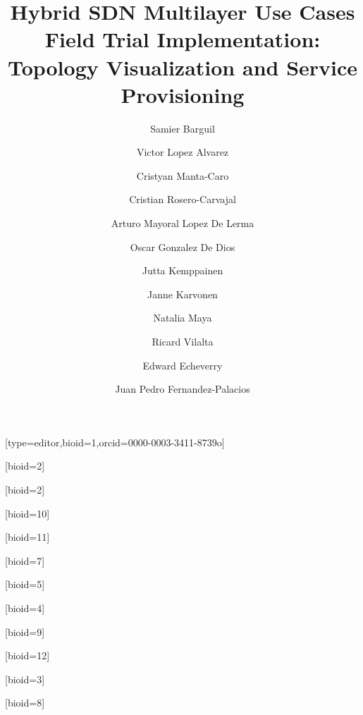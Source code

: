 \documentclass[a4paper,fleqn]{cas-dc}
\begin{document}
\let\WriteBookmarks\relax
\def\floatpagepagefraction{1}
\def\textpagefraction{.001}

\title [mode = title]{Hybrid SDN  Multilayer Use Cases Field Trial Implementation: Topology Visualization and Service Provisioning}                      



\author[1,4]{Samier Barguil}[type=editor,bioid=1,orcid=0000-0003-3411-8739o]
\cormark[1]

\author[2]{Victor Lopez Alvarez}[bioid=2]

\author[4]{Cristyan Manta-Caro}[bioid=2]

\author[4]{Cristian Rosero-Carvajal}[bioid=10]

\author[2]{Arturo Mayoral Lopez De Lerma}[bioid=11]

\author[2]{Oscar Gonzalez De Dios}[bioid=7]

\author[5]{Jutta Kemppainen}[bioid=5]

\author[5]{Janne Karvonen}[bioid=4]

\author[5]{Natalia Maya}[bioid=9]

\author[6]{Ricard Vilalta}[bioid=12]

\author[3]{Edward Echeverry}[bioid=3]

\author[2]{Juan Pedro Fernandez-Palacios}[bioid=8]

\address[1]{Universidad Autonoma de Madrid, Madrid, Spain}
\address[2]{Telefonica I+D, Ronda de la Comunicacion, Madrid, Spain}
\address[3]{Telefonica Movistar, Transversal 60 No 114ª -55. Bogotá, Colombia}
\address[4]{Wipro Technologies Ltd., Doddakannelli, Sarjapur Road
Bengaluru - 560 035, India}
\address[5]{Infinera Corporation, 140 Caspian Court, Sunnyvale, CA 94089, USA}
\address[6]{Centre Tecnològic de Telecomunicacions de Catalunya, Castelldefels, Barcelona}
\end{document}
